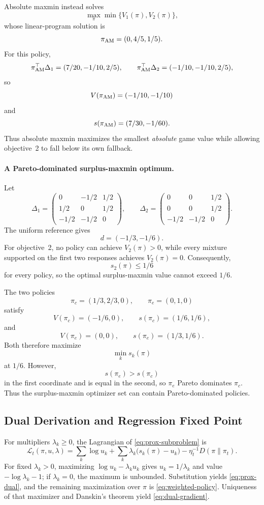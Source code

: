 \documentclass{article}
\theoremstyle{remark}
\theoremstyle{plain}
\begin{document}
Absolute maxmin instead solves
\[
\max_{\pi}\min\{V_1(\pi),V_2(\pi)\},
\]
whose linear-program solution is
\[
\pi_{\rm AM}=(0,4/5,1/5).
\]
For this policy,
\[
\pi_{\rm AM}^\top \Delta_1=(7/20,-1/10,2/5),
\qquad
\pi_{\rm AM}^\top \Delta_2=(-1/10,-1/10,2/5),
\]
so
\[
V(\pi_{\rm AM})=(-1/10,-1/10)
\]
and
\[
s(\pi_{\rm AM})
=
(7/30,-1/60).
\]
Thus absolute maxmin maximizes the smallest \emph{absolute} game value
while allowing objective~2 to fall below its own fallback.

\paragraph{A Pareto-dominated surplus-maxmin optimum.}
Let
\[
\Delta_1=
\begin{pmatrix}
0&-1/2&1/2\\
1/2&0&1/2\\
-1/2&-1/2&0
\end{pmatrix},
\qquad
\Delta_2=
\begin{pmatrix}
0&0&1/2\\
0&0&1/2\\
-1/2&-1/2&0
\end{pmatrix}.
\]
The uniform reference gives
\[
d=(-1/3,-1/6).
\]
For objective~2, no policy can achieve $V_2(\pi)>0$, while every mixture
supported on the first two responses achieves $V_2(\pi)=0$.
Consequently,
\[
s_2(\pi)\le 1/6
\]
for every policy, so the optimal surplus-maxmin value cannot exceed
$1/6$.

The two policies
\[
\pi_c=(1/3,2/3,0),
\qquad
\pi_e=(0,1,0)
\]
satisfy
\[
V(\pi_c)=(-1/6,0),
\qquad
s(\pi_c)=(1/6,1/6),
\]
and
\[
V(\pi_e)=(0,0),
\qquad
s(\pi_e)=(1/3,1/6).
\]
Both therefore maximize
\[
\min_k s_k(\pi)
\]
at $1/6$. However,
\[
s(\pi_e)>s(\pi_c)
\]
in the first coordinate and is equal in the second, so
$\pi_e$ Pareto dominates $\pi_c$. Thus the surplus-maxmin optimizer set
can contain Pareto-dominated policies.

\subsection{Dual Derivation and Regression Fixed Point}
\label{app:prox-dual}
For multipliers $\lambda_k\ge0$, the Lagrangian of \eqref{eq:prox-subproblem} is
\[
\mathcal L_t(\pi,u,\lambda)
=
\sum_k\log u_k
+
\sum_k\lambda_k\bigl(s_k(\pi)-u_k\bigr)
-
\eta_t^{-1}D(\pi\|\pi_t).
\]
For fixed $\lambda_k>0$, maximizing $\log u_k-\lambda_ku_k$ gives $u_k=1/\lambda_k$ and value $-\log\lambda_k-1$; if $\lambda_k=0$, the maximum is unbounded. Substitution yields \eqref{eq:prox-dual}, and the remaining maximization over $\pi$ is \eqref{eq:weighted-policy}. Uniqueness of that maximizer and Danskin's theorem yield \eqref{eq:dual-gradient}.
\end{document}
